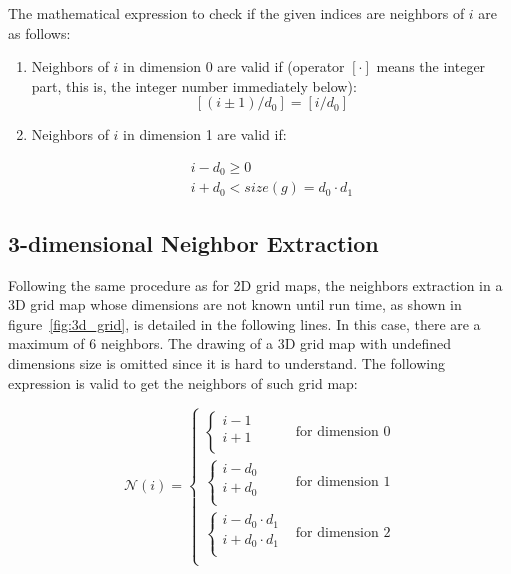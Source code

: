 \documentclass[12pt]{article}
\begin{document}
The mathematical expression to check if the given indices are neighbors of $i$ are as follows:

\begin{enumerate}
 \item Neighbors of $i$ in dimension 0 are valid if (operator $[\cdot]$ means the integer part, this is, the integer number immediately below):
  \begin{equation}
   \left[(i\pm1)/d_0\right] = \left[i/d_0\right]
  \end{equation}

 \item Neighbors of $i$ in dimension 1 are valid if:
 
   \begin{equation}
      \begin{array}{lcc}
	i-d_0 \geq 0 \\
	i+d_0 < size(g) = d_0\cdot d_1
      \end{array}
      \end{equation}
\end{enumerate}


\subsection{3-dimensional Neighbor Extraction}
Following the same procedure as for 2D grid maps, the neighbors extraction in a 3D grid map whose dimensions are not known until run time, as shown in figure~\ref{fig:3d_grid}, is detailed in the following lines. In this case, there are a maximum of 6 neighbors. The drawing of a 3D grid map with undefined dimensions size is omitted since it is hard to understand. The following expression is valid to get the neighbors of such grid map:

\begin{equation}
  \mathcal{N}(i) =
  \begin{cases}
      \begin{cases}
      i-1\\
      i+1\\
    \end{cases} & \text{for dimension 0}\\
     \begin{cases}
      i-d_0\\
      i+d_0\\
    \end{cases} & \text{for dimension 1}\\
     \begin{cases}
      i-d_0\cdot d_1\\
      i+d_0\cdot d_1\\
    \end{cases} & \text{for dimension 2}\\
  \end{cases}
  \label{eq:3d_neighbors}
\end{equation}
\end{document}
